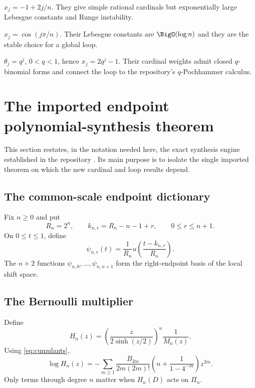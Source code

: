 \documentclass[11pt,oneside]{article}
\theoremstyle{definition}
\theoremstyle{remark}
\newcommand{\1}{\mathbf{1}}
\begin{document}
\begin{description}[leftmargin=3.4em,style=nextline]
\item[Equispaced nodes]
$x_j=-1+2j/n$.  They give simple rational cardinals but exponentially large
Lebesgue constants and Runge instability.
\item[Chebyshev--Lobatto nodes]
$x_j=\cos(j\pi/n)$.  Their Lebesgue constants are $\BigO(\log n)$ and they
are the stable choice for a global loop.
\item[Geometric nodes]
$\theta_j=q^j$, $0<q<1$, hence $x_j=2q^j-1$.  Their cardinal weights admit
closed $q$-binomial forms and connect the loop to the repository's
$q$-Pochhammer calculus.
\end{description}

\section{The imported endpoint polynomial-synthesis theorem}
\label{sec:endpoint-theorem}

This section restates, in the notation needed here, the exact synthesis
engine established in the repository \cite{UpSynthesisRepo}.  Its main purpose is to isolate the
single imported theorem on which the new cardinal and loop results depend.

\subsection{The common-scale endpoint dictionary}

Fix $n\ge0$ and put
\[
 R_n=2^n,
 \qquad
 k_{n,r}=R_n-n-1+r,
 \qquad 0\le r\le n+1.
\]
On $0\le t\le1$, define
\begin{equation}
 \psi_{n,r}(t)=\frac1{R_n}
 u\!\left(\frac{t-k_{n,r}}{R_n}\right).
 \label{eq:psi}
\end{equation}
The $n+2$ functions $\psi_{n,0},\ldots,\psi_{n,n+1}$ form the right-endpoint
basis of the local shift space.

\subsection{The Bernoulli multiplier}

Define
\begin{equation}
 H_n(z)=\left(\frac{z}{2\sinh(z/2)}\right)^n\frac1{M_u(z)}.
 \label{eq:H-product}
\end{equation}
Using \eqref{eq:cumulants},
\begin{equation}
 \log H_n(z)
 =-\sum_{m\ge1}
 \frac{B_{2m}}{2m(2m)!}
 \left(n+\frac1{1-4^{-m}}\right)z^{2m}.
 \label{eq:logH}
\end{equation}
Only terms through degree $n$ matter when $H_n(D)$ acts on $\Pi_n$.
\end{document}
